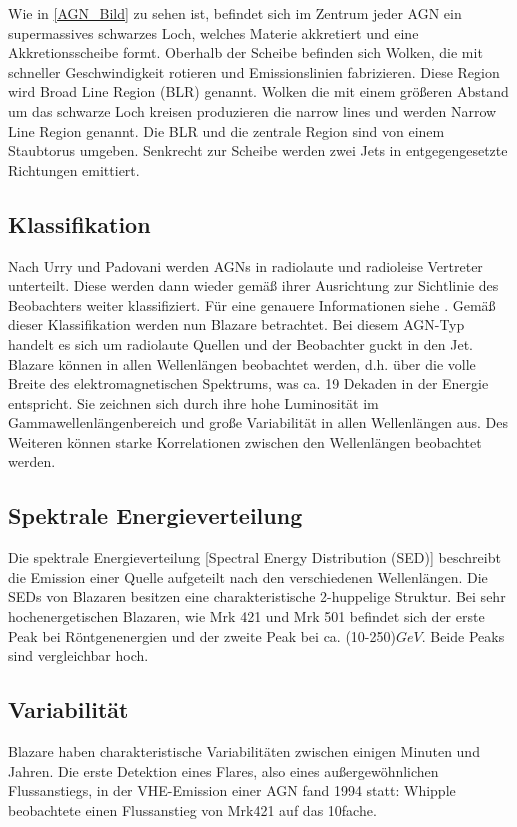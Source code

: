 Wie in \autoref{AGN_Bild} zu sehen ist, befindet sich im Zentrum jeder AGN ein supermassives schwarzes Loch, welches Materie akkretiert und eine Akkretionsscheibe formt.
Oberhalb der Scheibe befinden sich Wolken, die mit schneller Geschwindigkeit rotieren und Emissionslinien fabrizieren. Diese Region wird Broad Line Region (BLR) genannt.
Wolken die mit einem größeren Abstand um das schwarze Loch kreisen produzieren die narrow lines und werden Narrow Line Region genannt.
Die BLR und die zentrale Region sind von einem Staubtorus umgeben.
Senkrecht zur Scheibe werden zwei Jets in entgegengesetzte Richtungen emittiert.\cite{Weekes}

\subsection{Klassifikation}
Nach Urry und Padovani\cite{Urry_Padovani} werden AGNs in radiolaute und radioleise Vertreter unterteilt. 
Diese werden dann wieder gemäß ihrer Ausrichtung zur Sichtlinie des Beobachters weiter klassifiziert.
Für eine genauere Informationen siehe \cite{Urry_Padovani}.
Gemäß dieser Klassifikation werden nun Blazare betrachtet.
Bei diesem AGN-Typ handelt es sich um radiolaute Quellen und der Beobachter guckt in den Jet. 
Blazare können in allen Wellenlängen beobachtet werden, d.h. über die volle Breite des elektromagnetischen Spektrums, was ca. 19 Dekaden in der Energie entspricht.
Sie zeichnen sich durch ihre hohe Luminosität im Gammawellenlängenbereich und große Variabilität in allen Wellenlängen aus.
Des Weiteren können starke Korrelationen zwischen den Wellenlängen beobachtet werden.\cite{Weekes}

\subsection{Spektrale Energieverteilung}
Die spektrale Energieverteilung [Spectral Energy Distribution (SED)] beschreibt die Emission einer Quelle aufgeteilt nach den verschiedenen Wellenlängen.
Die SEDs von Blazaren besitzen eine charakteristische 2-huppelige Struktur.
Bei sehr hochenergetischen Blazaren, wie Mrk 421 und Mrk 501 befindet sich der erste Peak bei Röntgenenergien und der zweite Peak bei ca. (10-250)$\si{GeV}$.
Beide Peaks sind vergleichbar hoch.\cite{Weekes}


\subsection{Variabilität}
Blazare haben charakteristische Variabilitäten zwischen einigen Minuten und Jahren.
Die erste Detektion eines Flares, also eines außergewöhnlichen Flussanstiegs, in der VHE-Emission einer AGN fand 1994 statt:
Whipple beobachtete einen Flussanstieg von Mrk421 auf das 10fache.\cite{Weekes}\cite{Mrk421_Outburst}

